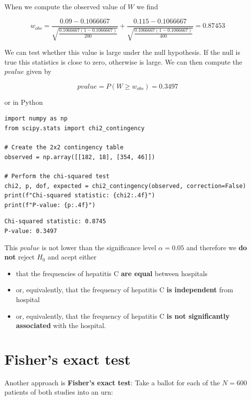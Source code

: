 \documentclass[
]{book}
\begin{document}
When we compute the observed value of \(W\) we find

\[w_{obs}= \frac{0.09-0.1066667}{\sqrt{\frac{0.1066667(1-0.1066667)}{200}}}+ \frac{0.115-0.1066667}{\sqrt{\frac{0.1066667(1-0.1066667)}{400}}}= 0.87453\]

We can test whether this value is large under the null hypothesis. If the null is true this statistics is close to zero, otherwise is large. We can then compute the \(pvalue\) given by

\[pvalue=P(W \geq w_{obs}) =0.3497\]

or in Python

\begin{verbatim}
import numpy as np
from scipy.stats import chi2_contingency

# Create the 2x2 contingency table
observed = np.array([[182, 18], [354, 46]])

# Perform the chi-squared test
chi2, p, dof, expected = chi2_contingency(observed, correction=False)
print(f"Chi-squared statistic: {chi2:.4f}")
print(f"P-value: {p:.4f}")
\end{verbatim}

\begin{verbatim}
Chi-squared statistic: 0.8745
P-value: 0.3497
\end{verbatim}

This \(pvalue\) is not lower than the significance level \(\alpha=0.05\) and therefore we \textbf{do not} reject \(H_0\) and acept either

\begin{itemize}
\item
  that the frequencies of hepatitis C \textbf{are equal} between hospitals
\item
  or, equivalently, that the frequency of hepatitis C \textbf{is independent} from hospital
\item
  or, equivalently, that the frequency of hepatitis C \textbf{is not significantly associated} with the hospital.
\end{itemize}

\hypertarget{fishers-exact-test}{%
\section{Fisher's exact test}\label{fishers-exact-test}}

Another approach is \textbf{Fisher's exact test}: Take a ballot for each of the \(N=600\) patients of both studies into an urn:
\end{document}
